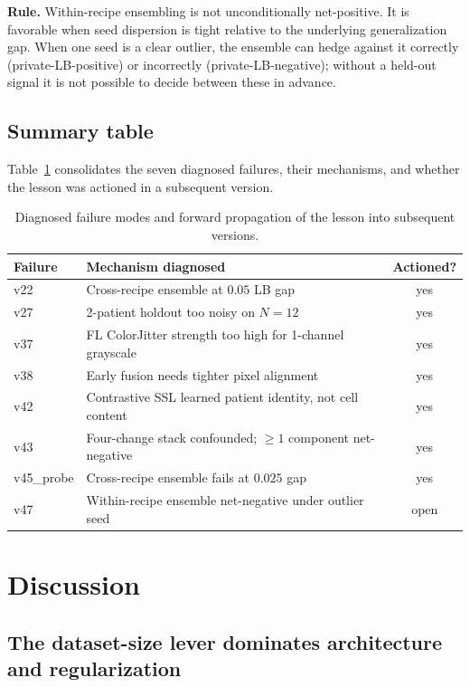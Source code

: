 \documentclass[conference]{IEEEtran}
\begin{document}
\textbf{Rule.} Within-recipe ensembling is not unconditionally net-positive. It is favorable when seed dispersion is tight relative to the underlying generalization gap. When one seed is a clear outlier, the ensemble can hedge against it correctly (private-LB-positive) or incorrectly (private-LB-negative); without a held-out signal it is not possible to decide between these in advance.

\subsection{Summary table}

Table~\ref{tab:failures} consolidates the seven diagnosed failures, their mechanisms, and whether the lesson was actioned in a subsequent version.

\begin{table}[!t]
  \centering
  \caption{Diagnosed failure modes and forward propagation of the lesson into subsequent versions.}
  \label{tab:failures}
  \footnotesize
  \begin{tabular}{@{}lp{4.5cm}c@{}}
    \toprule
    Failure & Mechanism diagnosed & Actioned? \\
    \midrule
    v22 & Cross-recipe ensemble at $0.05$ LB gap & yes \\
    v27 & 2-patient holdout too noisy on $N=12$ & yes \\
    v37 & FL ColorJitter strength too high for 1-channel grayscale & yes \\
    v38 & Early fusion needs tighter pixel alignment & yes \\
    v42 & Contrastive SSL learned patient identity, not cell content & yes \\
    v43 & Four-change stack confounded; $\ge 1$ component net-negative & yes \\
    v45\_probe & Cross-recipe ensemble fails at $0.025$ gap & yes \\
    v47 & Within-recipe ensemble net-negative under outlier seed & open \\
    \bottomrule
  \end{tabular}
\end{table}

\section{Discussion}
\label{sec:discussion}

\subsection{The dataset-size lever dominates architecture and regularization}
\end{document}
